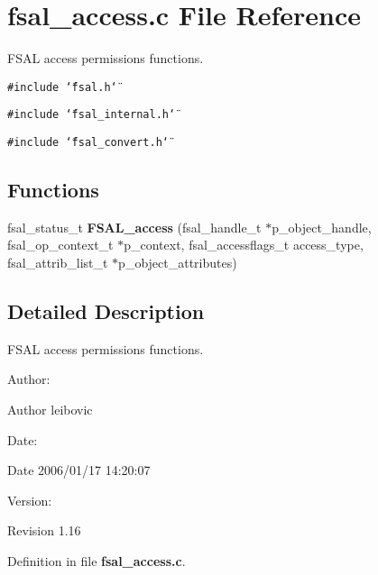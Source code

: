 \section{fsal\_\-access.c File Reference}
\label{fsal__access_8c}
FSAL access permissions functions.  


{\tt \#include \char`\"{}fsal.h\char`\"{}}\par
{\tt \#include \char`\"{}fsal\_\-internal.h\char`\"{}}\par
{\tt \#include \char`\"{}fsal\_\-convert.h\char`\"{}}\par
\subsection*{Functions}
\begin{CompactItemize}
\item 
fsal\_\-status\_\-t {\bf FSAL\_\-access} (fsal\_\-handle\_\-t $\ast$p\_\-object\_\-handle, fsal\_\-op\_\-context\_\-t $\ast$p\_\-context, fsal\_\-accessflags\_\-t access\_\-type, fsal\_\-attrib\_\-list\_\-t $\ast$p\_\-object\_\-attributes)
\end{CompactItemize}


\subsection{Detailed Description}
FSAL access permissions functions. 

\begin{Desc}
\item[Author:]\end{Desc}
\begin{Desc}
\item[Author]leibovic \end{Desc}
\begin{Desc}
\item[Date:]\end{Desc}
\begin{Desc}
\item[Date]2006/01/17 14:20:07 \end{Desc}
\begin{Desc}
\item[Version:]\end{Desc}
\begin{Desc}
\item[Revision]1.16 \end{Desc}


Definition in file {\bf fsal\_\-access.c}.

